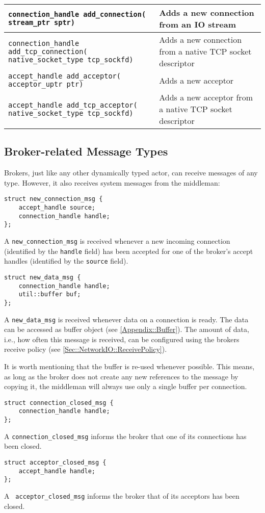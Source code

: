 {\begin{tabular*}{\textwidth}{m{}m{}}
  \hline
  \lstinline^connection_handle add_connection(^ \lstinline^stream_ptr sptr)^ & Adds a new connection from an IO stream \\
  \hline
  \lstinline^connection_handle add_tcp_connection(^ \lstinline^native_socket_type tcp_sockfd)^ & Adds a new connection from a native TCP socket descriptor \\
  \hline
  \lstinline^accept_handle add_acceptor(^ \lstinline^acceptor_uptr ptr)^ & Adds a new acceptor \\
  \hline
  \lstinline^accept_handle add_tcp_acceptor(^ \lstinline^native_socket_type tcp_sockfd)^ & Adds a new acceptor from a native TCP socket descriptor \\
  \hline
\end{tabular*}
}

\clearpage
\subsection{Broker-related Message Types}

Brokers, just like any other dynamically typed actor, can receive messages of any type.
However, it also receives system messages from the middleman:

\begin{lstlisting}
struct new_connection_msg {
    accept_handle source;
    connection_handle handle;
};
\end{lstlisting}

A \lstinline^new_connection_msg^ is received whenever a new incoming connection (identified by the \lstinline^handle^ field) has been accepted for one of the broker's accept handles (identified by the \lstinline^source^ field).

\begin{lstlisting}
struct new_data_msg {
    connection_handle handle;
    util::buffer buf;
};
\end{lstlisting}

A \lstinline^new_data_msg^ is received whenever data on a connection is ready.
The data can be accessed as buffer object (see \ref{Appendix::Buffer}).
The amount of data, i.e., how often this message is received, can be configured using the brokers receive policy (see \ref{Sec::NetworkIO::ReceivePolicy}).

It is worth mentioning that the buffer is re-used whenever possible.
This means, as long as the broker does not create any new references to the message by copying it, the middleman will always use only a single buffer per connection.

\begin{lstlisting}
struct connection_closed_msg {
    connection_handle handle;
};
\end{lstlisting}

A \lstinline^connection_closed_msg^ informs the broker that one of its connections has been closed.

\begin{lstlisting}
struct acceptor_closed_msg {
    accept_handle handle;
};
\end{lstlisting}

A \lstinline^ acceptor_closed_msg^ informs the broker that of its acceptors has been closed.
